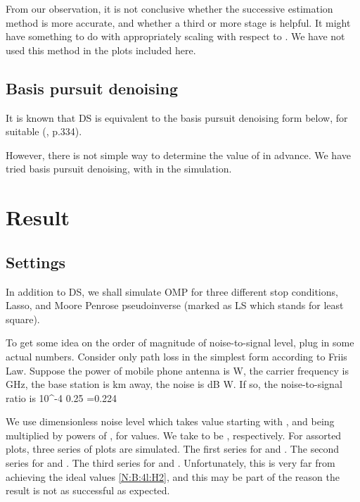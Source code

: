 From our observation, it is not conclusive whether the successive estimation method is more accurate, and whether a third or more stage is helpful.
It might have something to do with appropriately scaling  with respect to .
We have not used this method in the plots included here.

\subsection {Basis pursuit denoising}

It is known that DS is equivalent to the basis pursuit denoising form below, for suitable \m {\l} (\cite {BoV04}, p.334).


However, there is not simple way to determine the value of \m {\l} in advance.
We have tried basis pursuit denoising, with  in the simulation.

\section {Result}

\subsection {Settings}

In addition to DS, we shall simulate OMP for three different stop conditions, Lasso, and Moore Penrose pseudoinverse (marked as LS which stands for least square).

To get some idea on the order of magnitude of noise-to-signal level, plug in some actual numbers.
Consider only path loss in the simplest form according to Friis Law.
Suppose the power of mobile phone antenna is  W,
the carrier frequency is  GHz,
the base station is  km away,
the noise is  dB W.
If so, the noise-to-signal ratio is
 {
10^{-4}  {0.25} 
=0.224 
}

We use dimensionless noise level \m {\s} which takes value starting with , and being multiplied by powers of , for  values.
We take  to be , respectively.
For assorted plots, three series of plots are simulated.
The first series for  and .
The second series for  and .
The third series for  and .
Unfortunately, this is very far from achieving the ideal values \eqref {N:B:4l:H2}, and this may be part of the reason the result is not as successful as expected.

